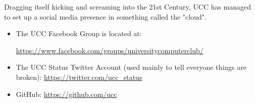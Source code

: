 \begin{mdframed}

Dragging itself kicking and screaming into the 21st Century, UCC has managed to set up a social media presence in something called the "cloud".

\begin{itemize}
\item The UCC Facebook Group is located at: 

\url{https://www.facebook.com/groups/universitycomputerclub/}
\item The UCC Status Twitter Account (used mainly to tell everyone things are broken): \url{https://twitter.com/ucc_status}
\item GitHub: \url{https://github.com/ucc}

\end{itemize}

\end{mdframed}
